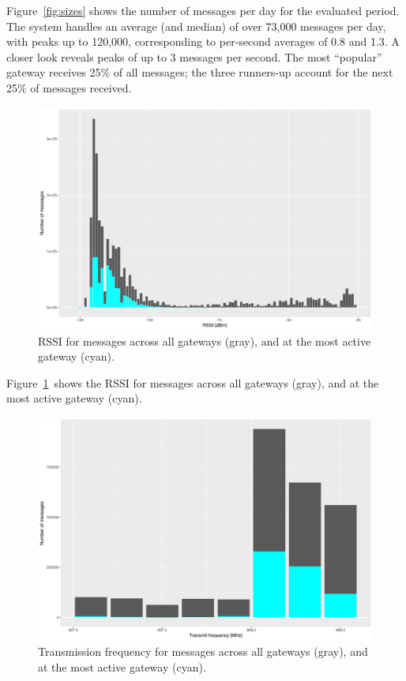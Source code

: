 Figure~\ref{fig:sizes} shows the number of messages per day for the
evaluated period. The system handles an average (and median) of over
73,000 messages per day, with peaks up to 120,000, corresponding to
per-second averages of 0.8 and 1.3. A closer look reveals peaks
of up to 3 messages per second. The most ``popular'' gateway
receives 25\% of all messages; the three runners-up account for
the next 25\% of messages received.

\begin{figure}
  \centering
  \includegraphics[width=\columnwidth]{figures/rssi.pdf}
  \caption{\acrshort{RSSI} for messages across all gateways (gray), and at the most active gateway (cyan).}
  \label{fig:rssi}
\end{figure}

Figure~\ref{fig:rssi} shows the \gls{RSSI} for messages across all
gateways (gray), and at the most active gateway (cyan).




\begin{figure}
  \centering
  \includegraphics[width=\columnwidth]{figures/qrg.pdf}
  \caption{Transmission frequency for messages across all gateways (gray), and at the most active gateway (cyan).}
  \label{fig:qrg}
\end{figure}

